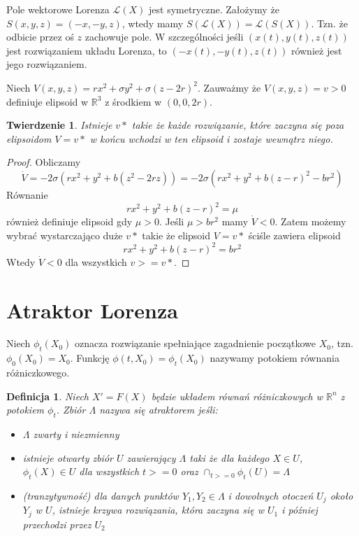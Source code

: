 \documentclass[12pt]{report}
\newtheorem{theorem}{Twierdzenie}
\newtheorem{definition}{Definicja}
\newcommand{\R}{\mathbb{R}}
\begin{document}
	\hspace{\parindent} Pole wektorowe Lorenza $\mathcal{L}(X)$ jest symetryczne. Założymy że $S(x, y, z) = (-x, -y, z)$, wtedy mamy $S(\mathcal{L}(X)) = \mathcal{L}(S(X))$. Tzn. że odbicie przez oś $z$ zachowuje pole. W szczególności jeśli $(x(t), y(t), z(t))$ jest rozwiązaniem układu Lorenza, to $(-x(t), -y(t), z(t))$ również jest jego rozwiązaniem.
	
	\hspace{\parindent} Niech $V(x, y, z) = rx^2 + \sigma y^2 + \sigma (z-2r)^2$. Zauważmy że $V(x, y, z) = v > 0$ definiuje elipsoid w $\R ^3$ z środkiem w $(0, 0, 2r)$.
	\begin{theorem}
		Istnieje $v*$ takie że każde rozwiązanie, które zaczyna się poza elipsoidom $V = v*$ w końcu wchodzi w ten elipsoid i zostaje wewnątrz niego.
	\end{theorem}
	\begin{proof}
		Obliczamy
			\[ \dot{V} = -2 \sigma (rx^2 + y^2 + b(z^2 - 2rz)) = -2 \sigma (rx^2 + y^2 + b(z - r)^2 - br^2) \]
		Równanie
			\[ rx^2 + y^2 + b(z - r)^2 = \mu \]
		również definiuje elipsoid gdy $\mu > 0$. Jeśli $\mu > br^2$ mamy $\dot{V} < 0$. Zatem możemy wybrać wystarczająco duże $v*$ takie że elipsoid $V = v*$ ściśle zawiera elipsoid
			\[ rx^2 + y^2 + b(z - r)^2 = br^2 \]
		Wtedy $\dot{V} < 0$ dla wszystkich $v >= v*$.
	\end{proof}

	\section{Atraktor Lorenza}
	\hspace{\parindent} Niech $\phi _t (X_0)$ oznacza rozwiązanie spełniające zagadnienie początkowe $X_0$, tzn. $\phi _0 (X_0) = X_0$. Funkcję $\phi (t, X_0) = \phi _t (X_0)$ nazywamy potokiem równania różniczkowego.
	\begin{definition}
		Niech $X' = F(X)$ będzie układem równań różniczkowych w $\R ^n$ z potokiem $\phi _t$. Zbiór $\Lambda$ nazywa się atraktorem jeśli:
		\begin{itemize}
			\item $\Lambda$ zwarty i niezmienny
			\item istnieje otwarty zbiór $U$ zawierający $\Lambda$ taki że dla każdego $X \in U$, $\phi _t (X) \in U$ dla wszystkich $t >= 0$ oraz $\cap _{t>=0} \phi _t (U) = \Lambda$
			\item (tranzytywność) dla danych punktów $Y_1, Y_2 \in \Lambda$ i dowolnych otoczeń $U_j$ około $Y_j$ w $U$, istnieje krzywa rozwiązania, która zaczyna się w $U_1$ i później przechodzi przez $U_2$
		\end{itemize}
	\end{definition}
\end{document}
